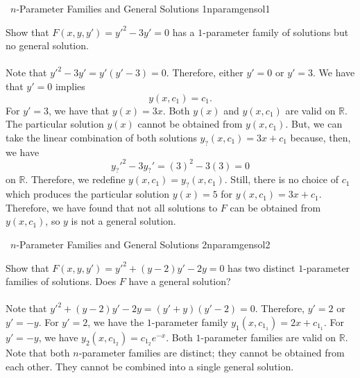        \begin{example}{\Difficulty\,\Difficulty\,\,\(n\)-Parameter Families and General Solutions 1}{nparamgensol1}

            Show that \(F(x,y,y')=y'^2-3y'=0\) has a \(1\)-parameter family of solutions but no general solution.
            \\
            \\
            Note that \(y'^2-3y'=y'(y'-3)=0\). Therefore, either \(y'=0\) or \(y'=3\). We have that \(y'=0\) implies
            \begin{equation*}
                y(x,c_1)=c_1.
            \end{equation*}
            For \(y'=3\), we have that \(y(x)=3x\). Both \(y(x)\) and \(y(x,c_1)\) are valid on \(\mathbb{R}\). The particular solution \(y(x)\) cannot be obtained from \(y(x,c_1)\). But, we can take the linear combination of both solutions \(y_?(x,c_1)=3x+c_1\) because, then, we have
            \begin{equation*}
                y_?'^2-3y_?'=(3)^2-3(3)=0
            \end{equation*}
            on \(\mathbb{R}\). Therefore, we redefine \(y(x,c_1)=y_?(x,c_1)\). Still, there is no choice of \(c_1\) which produces the particular solution \(y(x)=5\) for \(y(x,c_1)=3x+c_1\). Therefore, we have found that not all solutions to \(F\) can be obtained from \(y(x,c_1)\), so \(y\) is not a general solution.

       \end{example}
       \begin{example}{\Difficulty\,\Difficulty\,\,\(n\)-Parameter Families and General Solutions 2}{nparamgensol2}

            Show that \(F(x,y,y')=y'^2+(y-2)y'-2y=0\) has two distinct \(1\)-parameter families of solutions. Does \(F\) have a general solution?
            \\
            \\
            Note that \(y'^2+(y-2)y'-2y=(y'+y)(y'-2)=0\). Therefore, \(y'=2\) or \(y'=-y\). For \(y'=2\), we have the \(1\)-parameter family \(y_1(x,c_{1_1})=2x+c_{1_1}\). For \(y'=-y\), we have \(y_2(x,c_{1_2})=c_{1_2}e^{-x}\). Both \(1\)-parameter families are valid on \(\mathbb{R}\). Note that both \(n\)-parameter families are distinct; they cannot be obtained from each other. They cannot be combined into a single general solution.
        \end{example}

        \pagebreak

